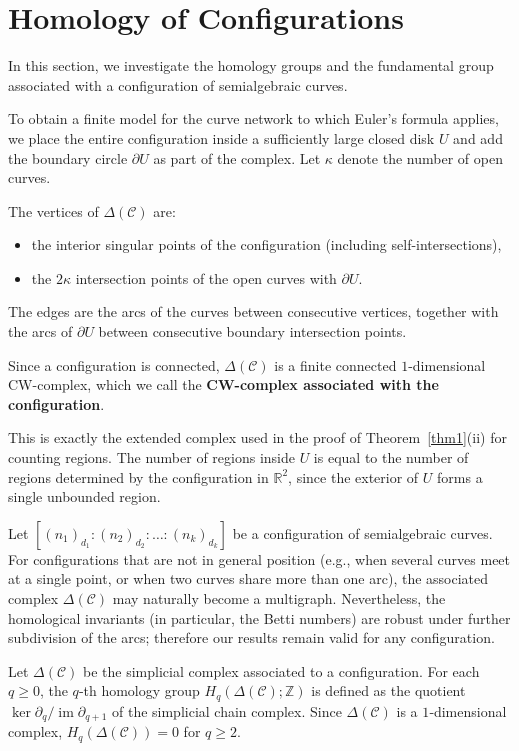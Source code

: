 \documentclass[article,11pt]{amsart} \numberwithin{equation}{section}
\numberwithin{equation}{section}
\begin{document}
{\section{Homology of Configurations}
\label{sec:homology}
In this section, we investigate the homology groups and the fundamental group
associated with a configuration of semialgebraic curves.

To obtain a finite model for the curve network to which Euler's formula
applies, we place the entire configuration inside a sufficiently large
closed disk $U$ and add the boundary circle $\partial U$ as part of the
complex. Let $\kappa$ denote the number of open curves.

The vertices of $\Delta(\mathcal C)$ are:
\begin{itemize}
	\item the interior singular points of the configuration (including self-intersections),
	\item the $2\kappa$ intersection points of the open curves with $\partial U$.
\end{itemize}

The edges are the arcs of the curves between consecutive vertices,
together with the arcs of $\partial U$ between consecutive boundary
intersection points.

Since a configuration is connected,
$\Delta(\mathcal C)$ is a finite connected $1$-dimensional CW-complex,
which we call the \textbf{CW-complex associated with the configuration}.

This is exactly the extended complex used in the proof of
Theorem~\ref{thm1}(ii) for counting regions. The number of regions inside
$U$ is equal to the number of regions determined by the configuration in
$\mathbb{R}^2$, since the exterior of $U$ forms a single unbounded region.

\begin{rk}
	Let $[(n_1)_{d_1} : (n_2)_{d_2} : \dots : (n_k)_{d_k}]$ be a configuration of semialgebraic curves. For configurations that are not in general position (e.g., when several curves meet at a single point, or when two curves share more than one arc), the associated complex $\Delta(\mathcal{C})$ may naturally become a multigraph. Nevertheless, the homological invariants (in particular, the Betti numbers) are robust under further subdivision of the arcs; therefore our results remain valid for any configuration.
\end{rk}

Let $\Delta(\mathcal{C})$ be the simplicial complex associated to a configuration. For each $q\ge 0$, the $q$‑th homology group $H_q(\Delta(\mathcal{C});\mathbb{Z})$ is defined as the quotient $\ker\partial_q / \operatorname{im}\partial_{q+1}$ of the simplicial chain complex. Since $\Delta(\mathcal{C})$ is a $1$‑dimensional complex, $H_q(\Delta(\mathcal{C}))=0$ for $q\ge 2$.

}
\end{document}
